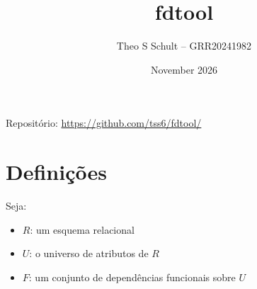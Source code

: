 \documentclass[11pt,a4paper]{article}
\title{fdtool}
\author{Theo S Schult -- GRR20241982}
\date{November 2026}
\begin{document}
\maketitle

\begin{center}
  Repositório: \url{https://github.com/tss6/fdtool/}
\end{center}

\section{Definições}

Seja:

\begin{itemize}
    \item $R$: um esquema relacional
    \item $U$: o universo de atributos de $R$
    \item $F$: um conjunto de dependências funcionais sobre $U$
\end{itemize}
\end{document}

